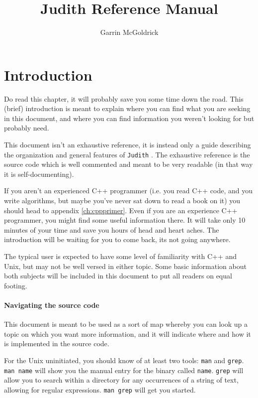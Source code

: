 \documentclass[10pt,a4paper]{book}
\author{Garrin McGoldrick}
\title{Judith Reference Manual}
\newcommand{\Judith}{\Verb`Judith` }
\begin{document}
\maketitle

\tableofcontents
\newpage


\chapter{Introduction}
\label{ch:introduction}

Do read this chapter, it will probably save you some time down the road. This (brief) introduction is meant to explain where you can find what you are seeking in this document, and where you can find information you weren't looking for but probably need.

This document isn't an exhaustive reference, it is instead only a guide describing the organization and general features of \Judith. The exhaustive reference is the source code which is well commented and meant to be very readable (in that way it is self-documenting).

If you aren't an experienced C++ programmer (i.e. you read C++ code, and you write algorithms, but maybe you've never sat down to read a book on it) you should head to appendix \ref{ch:cppprimer}. Even if you are an experience C++ programmer, you might find some useful information there. It will take only 10 minutes of your time and save you hours of head and heart aches. The introduction will be waiting for you to come back, its not going anywhere.

The typical user is expected to have some level of familiarity with C++ and Unix, but may not be well versed in either topic. Some basic information about both subjects will be included in this document to put all readers on equal footing.

\subsubsection*{Navigating the source code}

This document is meant to be used as a sort of map whereby you can look up a topic on which you want more information, and it will indicate where and how it is implemented in the source code.

For the Unix uninitiated, you should know of at least two tools: \Verb`man` and \Verb`grep`. \Verb`man name` will show you the manual entry for the binary called \Verb`name`. \Verb`grep` will allow you to search within a directory for any occurrences of a string of text, allowing for regular expressions. \Verb`man grep` will get you started.
\end{document}
